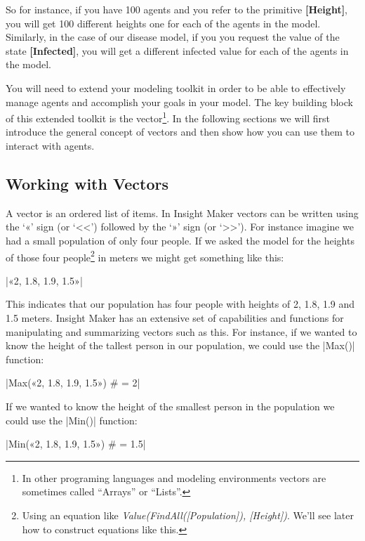 \documentclass[]{memoir}
\newcommand{\DecValTok}[1]{\textcolor[rgb]{0.25,0.63,0.44}{{#1}}}
\newcommand{\FloatTok}[1]{\textcolor[rgb]{0.25,0.63,0.44}{{#1}}}
\newcommand{\FunctionTok}[1]{\textcolor[rgb]{0.02,0.16,0.49}{{#1}}}
\newcommand{\NormalTok}[1]{{#1}}
\newcommand{\p}[1]{\textbf{{[}#1{]}}}
\begin{document}
So for instance, if you have 100 agents and you refer to the primitive
\p{Height}, you will get 100 different heights one for each of the
agents in the model. Similarly, in the case of our disease model, if you
you request the value of the state \p{Infected}, you will get a
different infected value for each of the agents in the model.

You will need to extend your modeling toolkit in order to be able to
effectively manage agents and accomplish your goals in your model. The
key building block of this extended toolkit is the vector\footnote{In
  other programing languages and modeling environments vectors are
  sometimes called ``Arrays'' or ``Lists''.}. In the following sections
we will first introduce the general concept of vectors and then show how
you can use them to interact with agents.

\subsection{Working with Vectors}

A vector is an ordered list of items. In Insight Maker vectors can be
written using the `«' sign (or `\textless{}\textless{}') followed by the
`»' sign (or `\textgreater{}\textgreater{}'). For instance imagine we
had a small population of only four people. If we asked the model for
the heights of those four people\footnote{Using an equation like
  \emph{Value(FindAll({[}Population{]}), {[}Height{]})}. We'll see later
  how to construct equations like this.} in meters we might get
something like this:

|\NormalTok{«2, }\FloatTok{1.8}\NormalTok{, }\FloatTok{1.9}\NormalTok{, }\FloatTok{1.5}\NormalTok{»}|

This indicates that our population has four people with heights of 2,
1.8, 1.9 and 1.5 meters. Insight Maker has an extensive set of
capabilities and functions for manipulating and summarizing vectors such
as this. For instance, if we wanted to know the height of the tallest
person in our population, we could use the
|\FunctionTok{Max}\NormalTok{()}| function:

|\FunctionTok{Max}\NormalTok{(«2, }\FloatTok{1.8}\NormalTok{, }\FloatTok{1.9}\NormalTok{, }\FloatTok{1.5}\NormalTok{») # = }\DecValTok{2}|

If we wanted to know the height of the smallest person in the population
we could use the |\FunctionTok{Min}\NormalTok{()}| function:

|\FunctionTok{Min}\NormalTok{(«2, }\FloatTok{1.8}\NormalTok{, }\FloatTok{1.9}\NormalTok{, }\FloatTok{1.5}\NormalTok{») # = }\FloatTok{1.5}|
\end{document}
